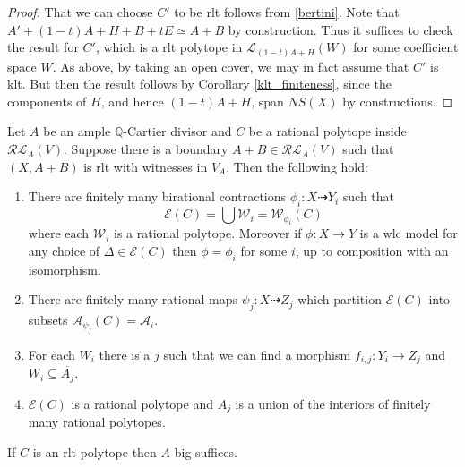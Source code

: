 \begin{proof}
		That we can choose $C'$ to be rlt follows from \autoref{bertini}. Note that $A'+(1-t)A+H+B+tE \simeq A+B$ by construction. Thus it suffices to check the result for $C'$, which is a rlt polytope in $\mathcal{L}_{(1-t)A+H}(W)$ for some coefficient space $W$. As above, by taking an open cover, we may in fact assume that $C'$ is klt. But then the result follows by Corollary \ref{klt_finiteness}, since the components of $H$, and hence $(1-t)A+H$, span $NS(X)$ by constructions.	

	\end{proof}


	
	\begin{theorem}\label{rltfiniteness}
		Let $A$ be an ample $\mathbb{Q}$-Cartier divisor and $C$ be a rational polytope inside $\mathcal{RL}_{A}(V)$. Suppose there is a boundary $A+B \in \mathcal{RL}_{A}(V)$ such that $(X,A+B)$ is rlt with witnesses in $V_{A}$. Then the following hold:
		
		\begin{enumerate}
			\item There are finitely many birational contractions $\phi_{i}:X \dashrightarrow Y_{i}$ such that 
			\[\mathcal{E}(C) = \bigcup \mathcal{W}_{i}=\mathcal{W}_{\phi_{i}}(C)\]
			where each $\mathcal{W}_{i}$ is a rational polytope. Moreover if $\phi:X \to Y$ is a wlc model for any choice of $\Delta \in \mathcal{E}(C)$ then $\phi=\phi_{i}$ for some $i$, up to composition with an isomorphism.
			
			\item There are finitely many rational maps $\psi_{j}:X \dashrightarrow Z_{j}$ which partition $\mathcal{E}(C)$ into subsets $\mathcal{A}_{\psi_{j}}(C)=\mathcal{A}_{i}$.
			\item  For each $W_{i}$ there is a $j$ such that we can find a morphism $f_{i,j}: Y_{i} \to Z_{j}$ and $W_{i} \subseteq \overline{A_{j}}$.
			\item  $\mathcal{E}(C)$ is a rational polytope and $A_{j}$ is a union of the interiors of finitely many rational polytopes.
		\end{enumerate}
	
	If $C$ is an rlt polytope then $A$ big suffices.
	\end{theorem}
	
